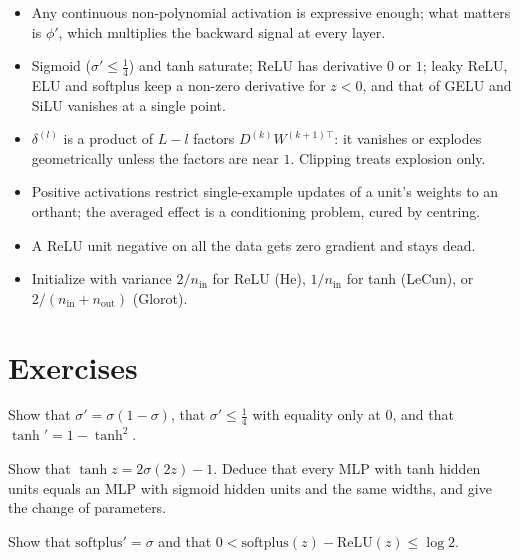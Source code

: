 \begin{notechapter}
\begin{chaptersummary}
\begin{itemize}[nosep]
  \item Any continuous non-polynomial activation is expressive enough; what matters is $\phi'$, which
        multiplies the backward signal at every layer.
  \item Sigmoid ($\sigma'\leq\frac14$) and tanh saturate; ReLU has derivative $0$ or $1$; leaky ReLU, ELU and softplus
        keep a non-zero derivative for $z<0$, and that of GELU and SiLU vanishes at a single point.
  \item $\delta^{(l)}$ is a product of $L - l$ factors $D^{(k)}W^{(k+1)\top}$: it vanishes or explodes geometrically unless the
        factors are near $1$. Clipping treats explosion only.
  \item Positive activations restrict single-example updates of a unit's weights to an orthant;
        the averaged effect is a conditioning problem, cured by centring.
  \item A ReLU unit negative on all the data gets zero gradient and stays dead.
  \item Initialize with variance $2/n_{\mathrm{in}}$ for ReLU (He), $1/n_{\mathrm{in}}$ for tanh (LeCun), or $2/(n_{\mathrm{in}} + n_{\mathrm{out}})$
        (Glorot).
\end{itemize}
\end{chaptersummary}

\section*{Exercises}

\begin{exercise}\label{activation-functions:exr:1}
Show that $\sigma' = \sigma(1 - \sigma)$, that $\sigma'\leq\frac14$ with equality only at $0$, and that $\tanh' = 1 - \tanh^2$.
\end{exercise}

\begin{exercise}\label{activation-functions:exr:2}
Show that $\tanh z = 2\sigma(2z) - 1$. Deduce that every MLP with tanh hidden units equals an MLP
with sigmoid hidden units and the same widths, and give the change of parameters.
\end{exercise}

\begin{exercise}\label{activation-functions:exr:3}
Show that $\mathrm{softplus}' = \sigma$ and that $0<\mathrm{softplus}(z) - \mathrm{ReLU}(z)\leq\log2$.
\end{exercise}


\end{notechapter}
